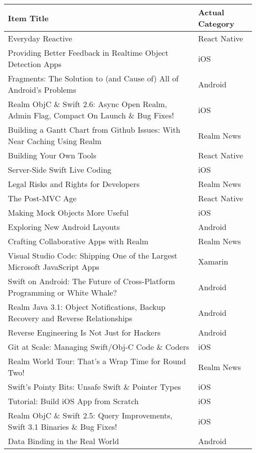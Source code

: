 \documentclass[letterpaper,11pt]{article}
\begin{document}
\clearpage

\begin{table}[h]
\centering
\begin{adjustbox}{max width=\linewidth}
\begin{tabular}{ | l | l |}
\hline
\textbf{Item Title} & \textbf{Actual Category} \\
\hline
Everyday Reactive & React Native \\ 
Providing Better Feedback in Realtime Object Detection Apps & iOS \\ 
Fragments: The Solution to (and Cause of) All of Android's Problems & Android \\ 
Realm ObjC \& Swift 2.6: Async Open Realm, Admin Flag, Compact On Launch \& Bug Fixes! & iOS \\ 
Building a Gantt Chart from Github Issues: With Near Caching Using Realm & Realm News  \\ 
Building Your Own Tools & React Native  \\ 
Server-Side Swift Live Coding & iOS  \\ 
Legal Risks and Rights for Developers & Realm News  \\ 
The Post-MVC Age & React Native \\ 
Making Mock Objects More Useful & iOS \\ 
Exploring New Android Layouts & Android \\ 
Crafting Collaborative Apps with Realm & Realm News \\ 
Visual Studio Code: Shipping One of the Largest Microsoft JavaScript Apps & Xamarin \\ 
Swift on Android: The Future of Cross-Platform Programming or White Whale? & Android \\ 
Realm Java 3.1: Object Notifications, Backup Recovery and Reverse Relationships & Android \\ 
Reverse Engineering Is Not Just for Hackers & Android \\ 
Git at Scale: Managing Swift/Obj-C Code \& Coders & iOS \\ 
Realm World Tour: That’s a Wrap Time for Round Two! & Realm News \\ 
Swift's Pointy Bits: Unsafe Swift \& Pointer Types & iOS  \\ 
Tutorial: Build iOS App from Scratch & iOS  \\ 
Realm ObjC \& Swift 2.5: Query Improvements, Swift 3.1 Binaries \& Bug Fixes! & iOS\\ 
Data Binding in the Real World & Android \\ 

\end{tabular}
\end{adjustbox}
\end{table}
\end{document}
